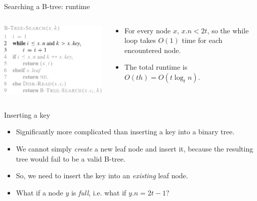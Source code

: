 \documentclass[11pt,t]{beamer}
\begin{document}
	\begin{frame}{Searching a B-tree: runtime}
		\begin{columns}[c]
			\begin{column}{.5\textwidth}
				\includegraphics[width=.9\columnwidth]{images/runtime}
			\end{column}
			\begin{column}{.5\textwidth}
				\begin{itemize}[<+->]
					\item For every node \(x\), \(x.n < 2t\), so the while loop takes \(O(1)\) time for each encountered node.
					\item The total runtime is \(O(th)=O(t \log_t n)\).
				\end{itemize}
			\end{column}
		\end{columns}
	\end{frame}

	\begin{frame}{Inserting a key}
		\begin{itemize}[<+->]
			\item Significantly more complicated than inserting a key into a binary tree.
			\item We cannot simply \textit{create} a new leaf node and insert it, because the resulting tree would fail to be a valid B-tree.
			\item So, we need to insert the key into an \textit{existing} leaf node.
			\item What if a node \(y\) is \textit{full}, i.e. what if \(y.n = 2t-1\)?
		\end{itemize}
	\end{frame}
\end{document}
